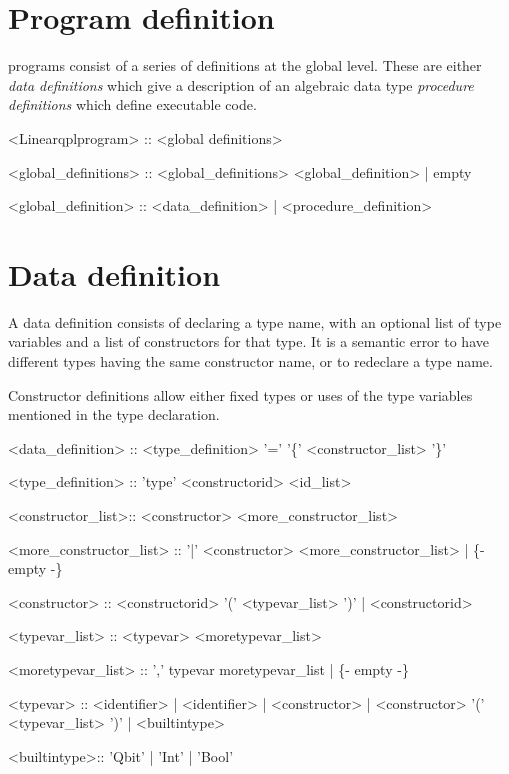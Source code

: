 \section{Program definition}\label{sec:bnfProgramDefinition}
\lqpl{} programs consist of a series of definitions at the
global level. These are either \emph{data definitions} which
give a description of an algebraic data type \emph{procedure definitions}
which define executable code.

\begin{singlespace}
\begin{bnf}
   <Linearqplprogram>   :: <global definitions>
  
   <global_definitions> :: <global_definitions> <global_definition>
        | empty 
  
   <global_definition> :: <data_definition>
        | <procedure_definition>
\end{bnf}
\end{singlespace}

\section{Data definition}\label{sec:bnfDataDefinition}
A data definition consists of declaring a type name, with an optional
list of type variables and a list of constructors for that type. 
It is a semantic error to have different types having the same 
constructor name, or to redeclare a type name. 

Constructor definitions allow either fixed types or uses of the
type variables mentioned in the type declaration. 

\begin{singlespace}
\begin{bnf}
   <data_definition> :: <type_definition> '=' 
                        '\{' <constructor_list> '\}'
  
   <type_definition> :: 'type' <constructorid> <id_list>
  
   <constructor_list>:: <constructor> <more_constructor_list>
      
   <more_constructor_list> :: 
        '|' <constructor> <more_constructor_list>
        | \{- empty -\}
  
   <constructor> :: <constructorid> '(' <typevar_list> ')'
        | <constructorid>
  
   <typevar_list> :: <typevar> <moretypevar_list>
             
   <moretypevar_list> :: ',' typevar moretypevar_list
        | \{- empty -\} 

   <typevar> :: <identifier> 
        | <identifier>
        | <constructor>
        | <constructor> '(' <typevar_list> ')' 
        | <builtintype>

   <builtintype>:: 'Qbit'  | 'Int' | 'Bool'
\end{bnf}
\end{singlespace}

